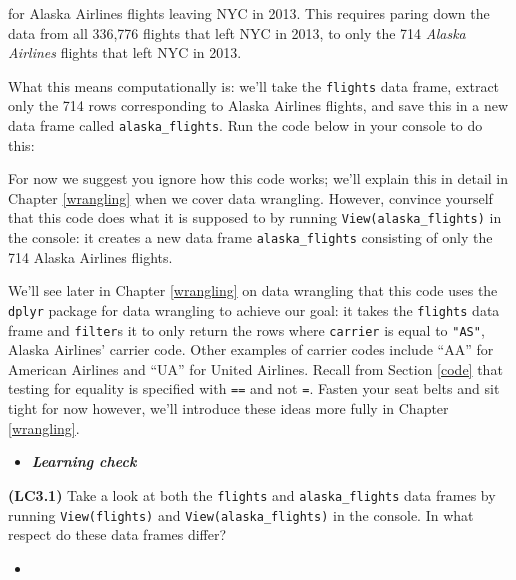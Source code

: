 \documentclass[12pt,]{krantz}
\makeatletter
\newenvironment{Shaded}{\begin{snugshade}}{\end{snugshade}}
\newcommand{\KeywordTok}[1]{\textcolor[rgb]{0.27,0.27,0.27}{\textbf{#1}}}
\newcommand{\StringTok}[1]{\textcolor[rgb]{0.5,0.5,0.5}{#1}}
\newcommand{\OperatorTok}[1]{\textcolor[rgb]{0.43,0.43,0.43}{\textbf{#1}}}
\newcommand{\NormalTok}[1]{#1}
\newenvironment{kframe}{%
\medskip{}
\setlength{\fboxsep}{.8em}
 \def\at@end@of@kframe{}%
 \ifinner\ifhmode%
  \def\at@end@of@kframe{\end{minipage}}%
  \begin{minipage}{\columnwidth}%
 \fi\fi%
 \def\FrameCommand##1{\hskip\@totalleftmargin \hskip-\fboxsep
 \colorbox{shadecolor}{##1}\hskip-\fboxsep
     \hskip-\linewidth \hskip-\@totalleftmargin \hskip\columnwidth}%
 \MakeFramed {\advance\hsize-\width
   \@totalleftmargin\z@ \linewidth\hsize
   \@setminipage}}%
 {\par\unskip\endMakeFramed%
 \at@end@of@kframe}
\renewenvironment{Shaded}{\begin{kframe}}{\end{kframe}}
\newenvironment{rmdblock}[1]
  {\begin{shaded*}
  \begin{itemize}
  \renewcommand{\labelitemi}{
    \raisebox{-.7\height}[0pt][0pt]{
    }
  }
  \item
  }
  {
  \end{itemize}
  \end{shaded*}
  }
\newenvironment{learncheck}
  {\begin{rmdblock}{warning}}
  {\end{rmdblock}}
\theoremstyle{definition}
\theoremstyle{definition}
\theoremstyle{definition}
\theoremstyle{remark}
\makeatother
\begin{document}
for Alaska Airlines flights leaving NYC in 2013. This requires paring
down the data from all 336,776 flights that left NYC in 2013, to only
the 714 \emph{Alaska Airlines} flights that left NYC in 2013.

What this means computationally is: we'll take the \texttt{flights} data
frame, extract only the 714 rows corresponding to Alaska Airlines
flights, and save this in a new data frame called
\texttt{alaska\_flights}. Run the code below in your console to do this:

\begin{Shaded}
\end{Shaded}

For now we suggest you ignore how this code works; we'll explain this in
detail in Chapter \ref{wrangling} when we cover data wrangling. However,
convince yourself that this code does what it is supposed to by running
\texttt{View(alaska\_flights)} in the console: it creates a new data
frame \texttt{alaska\_flights} consisting of only the 714 Alaska
Airlines flights.

We'll see later in Chapter \ref{wrangling} on data wrangling that this
code uses the \texttt{dplyr} package for data wrangling to achieve our
goal: it takes the \texttt{flights} data frame and \texttt{filter}s it
to only return the rows where \texttt{carrier} is equal to
\texttt{"AS"}, Alaska Airlines' carrier code. Other examples of carrier
codes include ``AA'' for American Airlines and ``UA'' for United
Airlines. Recall from Section \ref{code} that testing for equality is
specified with \texttt{==} and not \texttt{=}. Fasten your seat belts
and sit tight for now however, we'll introduce these ideas more fully in
Chapter \ref{wrangling}.

\begin{learncheck}
\textbf{\emph{Learning check}}
\end{learncheck}

\textbf{(LC3.1)} Take a look at both the \texttt{flights} and
\texttt{alaska\_flights} data frames by running \texttt{View(flights)}
and \texttt{View(alaska\_flights)} in the console. In what respect do
these data frames differ?

\begin{learncheck}

\end{learncheck}
\end{document}
